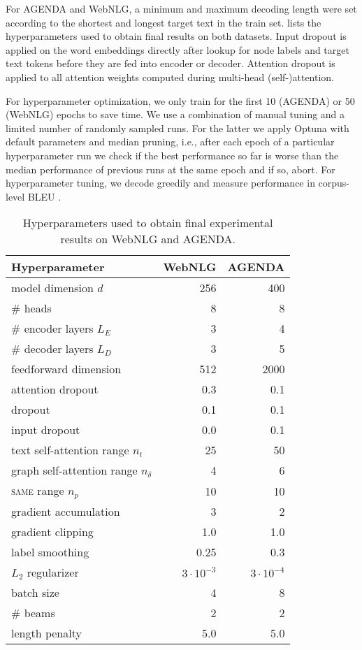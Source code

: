 \documentclass[11pt]{article}
\newcommand{\E}{L_E}  \newcommand{\D}{L_D}  \newcommand{\relset}{\mathcal{R}}
\newcommand{\sameEnt}{\textsc{same}}
\begin{document}
For AGENDA and WebNLG, a minimum and maximum decoding length were set according to the shortest and longest target text in the train set.
 lists the hyperparameters used to obtain final results on both datasets.
Input dropout is applied on the word embeddings directly after lookup for node labels and target text tokens
before they are fed into encoder or decoder.
Attention dropout is applied to all attention weights computed during multi-head (self-)attention.

For hyperparameter optimization,
we only train for the first 10 (AGENDA) or 50 (WebNLG) epochs to save time.
We use a combination of manual tuning and a limited number of randomly sampled runs.
For the latter we apply Optuna with default parameters \citep{optuna19,bergstra11} and median pruning, 
i.e., after each epoch of a particular hyperparameter run
we check if the best performance so far is worse
than the median performance of previous runs at the same epoch
and if so, abort.
For hyperparameter tuning, we decode greedily and measure performance in corpus-level BLEU \citep{papineni-etal-2002-bleu}.

\begin{table}[t]
	\centering
	\small
	\begin{tabular}{lrr}
		\toprule
		Hyperparameter & WebNLG & AGENDA\\
		\midrule
		model dimension $d$ & 256 & 400 \\
		\#{} heads & 8 & 8 \\
		\#{} encoder layers $\E$ & 3 & 4 \\
		\#{} decoder layers $\D$ & 3 & 5 \\
		feedforward dimension & 512 & 2000 \\
		attention dropout & 0.3 & 0.1 \\
		dropout & 0.1 & 0.1 \\
		input dropout & 0.0 & 0.1 \\
		text self-attention range $n_t$ & 25 & 50 \\
		graph self-attention range $n_\delta$ & 4 & 6\\
		\sameEnt{} range $n_p$ & 10 & 10 \\
		gradient accumulation & 3 & 2 \\
		gradient clipping & 1.0 & 1.0 \\
		label smoothing & 0.25 & 0.3 \\
		$L_2$ regularizer & $3\cdot10^{-3}$ & $3\cdot10^{-4}$ \\
		batch size & 4 & 8 \\
		\midrule
		\#{} beams & 2 & 2 \\
		length penalty & 5.0 & 5.0 \\
		\bottomrule
	\end{tabular}
    \caption{Hyperparameters used to obtain final experimental results on WebNLG and AGENDA.}
    \label{tab:hparams}
\end{table}
\end{document}
